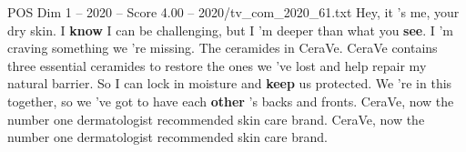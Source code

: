 \begin{textsample}{POS Dim 1 – 2020 – Score 4.00 – 2020/tv\_com\_2020\_61.txt}  \label{ex:f1_pos_086}
Hey, it 's me, your dry skin.
I \textbf{know} I can be challenging, but I 'm deeper than what you \textbf{see}.
I 'm craving something we 're missing.
The ceramides in CeraVe.
CeraVe contains three essential ceramides to restore the ones we 've lost and help repair my natural barrier.
So I can lock in moisture and \textbf{keep} us protected.
We 're in this together, so we 've got to have each \textbf{other} 's backs and fronts.
CeraVe, now the number one dermatologist recommended skin care brand.
CeraVe, now the number one dermatologist recommended skin care brand.

\end{textsample}
